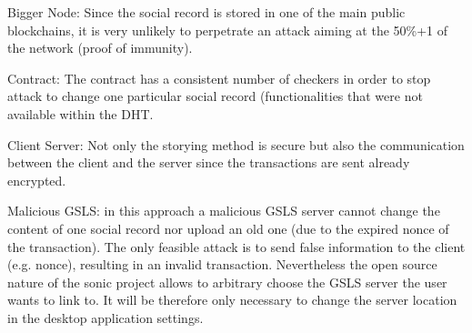 \begin{list}{}{}
\item {Bigger Node}: Since the social record is stored in one of the main public blockchains, it is very unlikely to perpetrate an attack aiming at the 50\%+1 of the network (proof of immunity).
\item {Contract}: The contract has a consistent number of checkers in order to stop attack to change one particular social record (functionalities that were not available within the DHT.
\item {Client Server}: Not only the storying method is secure but also the communication between the client and the server since the transactions are sent already encrypted.
\item {Malicious GSLS}: in this approach a malicious GSLS server cannot change the content of one social record nor upload an old one (due to the expired nonce of the transaction). The only feasible attack is to send false information to the client (e.g. nonce), resulting in an invalid transaction. Nevertheless the open source nature of the sonic project allows to arbitrary choose the GSLS server the user wants to link to. It will be therefore only necessary to change the server location in the desktop application settings.
\end{list}